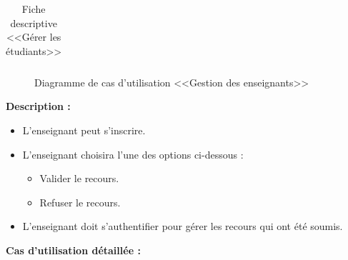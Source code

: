 \documentclass[12pt]{report}
\begin{document}
\begin{table}[h]
\begin{tabular}{|c|l|}
\end{tabular}
    \caption{Fiche descriptive <<Gérer les étudiants>>}
\end{table}

\begin{figure}[H]
\centering
  \vspace{-0.1in}
    \centerline{}
    \caption{Diagramme de cas d'utilisation <<Gestion des enseignants>>}
  \vspace*{-0.3in}
\end{figure}

\newpage

\vspace{0.1in}

\textbf{Description :}

\begin{itemize}
    \item L'enseignant peut s'inscrire.
    \item L'enseignant choisira l'une des options ci-dessous :
    \begin{itemize}
        \item Valider le recours.
        \item Refuser le recours.
    \end{itemize}
    \item L'enseignant doit s'authentifier pour gérer les recours qui ont été soumis.
\end{itemize}

\vspace{0.2in}

\textbf{Cas d'utilisation détaillée :}

\vspace{0.2in}
\end{document}
